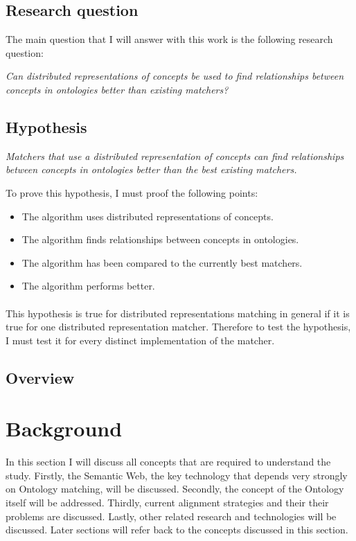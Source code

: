 \documentclass{article}
\begin{document}
 \subsection{Research question} \label{researchquestion}
 The main question that I will answer with this work is the following research question:
 
 \begin{center}
 \textit{
 Can distributed representations of concepts be used to find relationships between concepts in ontologies better than existing matchers?
 }
 \end{center}
 
 \subsection{Hypothesis} \label{hypotheses}
 
 \begin{center}
 \textit{Matchers that use a distributed representation of concepts can find relationships between concepts in ontologies better than the best existing matchers.}
 \end{center}

 To prove this hypothesis, I must proof the following points:
 \begin{itemize}
 \item The algorithm uses distributed representations of concepts.
 \item The algorithm finds relationships between concepts in ontologies.
 \item The algorithm has been compared to the currently best matchers.
 \item The algorithm performs better.
 \end{itemize} 
 
 \paragraph{}
 This hypothesis is true for distributed representations matching in general if it is true for one distributed representation matcher. Therefore to test the hypothesis, I must test it for every distinct implementation of the matcher.
 
 \subsection{Overview} %

 
\newpage
\section{Background}
 In this section I will discuss all concepts that are required to understand the study. Firstly, the Semantic Web, the key technology that depends very strongly on Ontology matching, will be discussed. Secondly, the concept of the Ontology itself will be addressed. Thirdly, current alignment strategies and their their problems are discussed. Lastly, other related research and technologies will be discussed. Later sections will refer back to the concepts discussed in this section.
\end{document}
